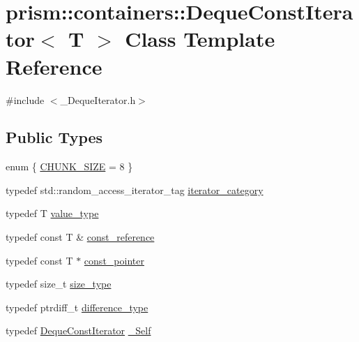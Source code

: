 \hypertarget{classprism_1_1containers_1_1_deque_const_iterator}{}\section{prism\+:\+:containers\+:\+:Deque\+Const\+Iterator$<$ T $>$ Class Template Reference}
\label{classprism_1_1containers_1_1_deque_const_iterator}


{\ttfamily \#include $<$\+\_\+\+Deque\+Iterator.\+h$>$}

\subsection*{Public Types}
\begin{DoxyCompactItemize}
\item 
enum \{ \hyperlink{classprism_1_1containers_1_1_deque_const_iterator_a6e21cb16d5a220121ed16fdd4cabe84aa1aa5bd9c4d095a95b3354c4cbd7b9880}{C\+H\+U\+N\+K\+\_\+\+S\+I\+ZE} = 8
 \}
\item 
typedef std\+::random\+\_\+access\+\_\+iterator\+\_\+tag \hyperlink{classprism_1_1containers_1_1_deque_const_iterator_af1ad30578f35a583a93d20868644c7e0}{iterator\+\_\+category}
\item 
typedef T \hyperlink{classprism_1_1containers_1_1_deque_const_iterator_a094727b1488122c12004cf255f3c8695}{value\+\_\+type}
\item 
typedef const T \& \hyperlink{classprism_1_1containers_1_1_deque_const_iterator_a5e350fb8bacd72830c54e2a419cc2515}{const\+\_\+reference}
\item 
typedef const T $\ast$ \hyperlink{classprism_1_1containers_1_1_deque_const_iterator_aeee46255ac509f1b2cbe6b70a12e031a}{const\+\_\+pointer}
\item 
typedef size\+\_\+t \hyperlink{classprism_1_1containers_1_1_deque_const_iterator_a30b8ab79e1eb12d4b6f82dd9782ea216}{size\+\_\+type}
\item 
typedef ptrdiff\+\_\+t \hyperlink{classprism_1_1containers_1_1_deque_const_iterator_af115398aea2ef58843b04f0f5ad84689}{difference\+\_\+type}
\item 
typedef \hyperlink{classprism_1_1containers_1_1_deque_const_iterator}{Deque\+Const\+Iterator} \hyperlink{classprism_1_1containers_1_1_deque_const_iterator_a5337ff83b02dad8f93642f44af581941}{\+\_\+\+Self}
\end{DoxyCompactItemize}
